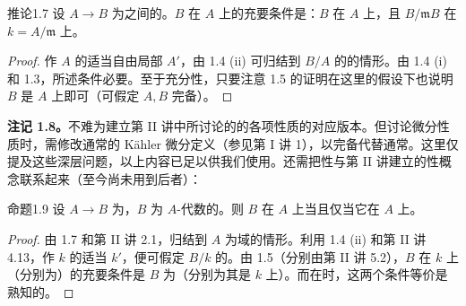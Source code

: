 \begin{SGAresult}{推论}{1.7}
设 $A\to B$ 为之间的。$B$ 在 $A$ 上的充要条件是：$B$ 在 $A$ 上，且 $B/\mathfrak mB$ 在 $k=A/\mathfrak m$ 上。
\end{SGAresult}
\begin{proof}
作 $A$ 的适当自由局部 $A'$，由 1.4 (ii) 可归结到 $B/A$ 的的情形。由 1.4 (i) 和 1.3，所述条件必要。至于充分性，只要注意 1.5 的证明在这里的假设下也说明 $B$ 是 $A$ 上即可（可假定 $A,B$ 完备）。
\end{proof}
\textbf{注记 1.8。}不难为建立第 II 讲中所讨论的的各项性质的对应版本。但讨论微分性质时，需修改通常的 Kähler 微分定义（参见第 I 讲 1），以完备代替通常。这里仅提及这些深层问题，以上内容已足以供我们使用。还需把性与第 II 讲建立的性概念联系起来（至今尚未用到后者）：
\begin{SGAresult}{命题}{1.9}
设 $A\to B$ 为，$B$ 为 $A$-代数的。则 $B$ 在 $A$ 上当且仅当它在 $A$ 上。
\end{SGAresult}
\begin{proof}
由 1.7 和第 II 讲 2.1，归结到 $A$ 为域的情形。利用 1.4 (ii) 和第 II 讲 4.13，作 $k$ 的适当 $k'$，便可假定 $B/k$ 的。由 1.5（分别由第 II 讲 5.2），$B$ 在 $k$ 上（分别为）的充要条件是 $B$ 为（分别为其是 $k$ 上）。而在时，这两个条件等价是熟知的。
\end{proof}
